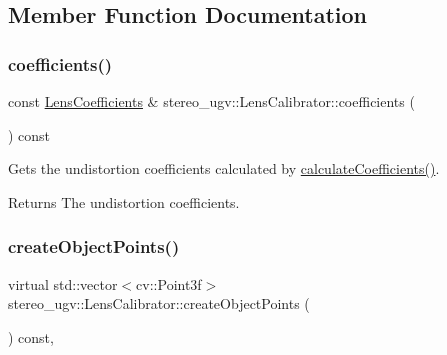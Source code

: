 \subsection{Member Function Documentation}
\mbox{\label{classstereo__ugv_1_1LensCalibrator_a570522d1aa54e4ec153b47f6b86063e2}} 
\subsubsection{\texorpdfstring{coefficients()}{coefficients()}}
{\footnotesize\ttfamily const \hyperlink{structstereo__ugv_1_1LensCoefficients}{Lens\+Coefficients} \& stereo\+\_\+ugv\+::\+Lens\+Calibrator\+::coefficients (\begin{DoxyParamCaption}{ }\end{DoxyParamCaption}) const\hspace{0.3cm}{\ttfamily [noexcept]}}



Gets the undistortion coefficients calculated by \hyperlink{classstereo__ugv_1_1LensCalibrator_aeeb532144b29ae7004ee14e2695def97}{calculate\+Coefficients()}. 

\begin{DoxyReturn}{Returns}
The undistortion coefficients. 
\end{DoxyReturn}
\mbox{\label{classstereo__ugv_1_1LensCalibrator_a3edf81dfc9567904a0d1a7c3555d65bf}} 
\subsubsection{\texorpdfstring{create\+Object\+Points()}{createObjectPoints()}}
{\footnotesize\ttfamily virtual std\+::vector$<$cv\+::\+Point3f$>$ stereo\+\_\+ugv\+::\+Lens\+Calibrator\+::create\+Object\+Points (\begin{DoxyParamCaption}{ }\end{DoxyParamCaption}) const\hspace{0.3cm}{\ttfamily [protected]}, {}}



